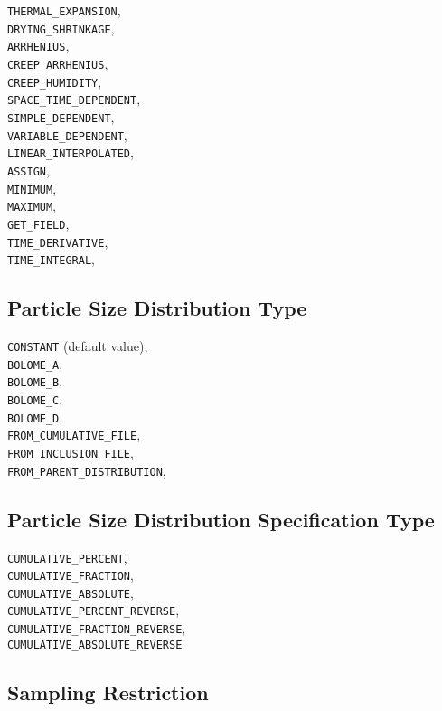 \documentclass[10pt]{article}
\begin{document}
\verb+THERMAL_EXPANSION+,\\
\verb+DRYING_SHRINKAGE+,\\
\verb+ARRHENIUS+,\\
\verb+CREEP_ARRHENIUS+,\\
\verb+CREEP_HUMIDITY+,\\
\verb+SPACE_TIME_DEPENDENT+,\\
\verb+SIMPLE_DEPENDENT+,\\
\verb+VARIABLE_DEPENDENT+,\\
\verb+LINEAR_INTERPOLATED+,\\
\verb+ASSIGN+,\\
\verb+MINIMUM+,\\
\verb+MAXIMUM+,\\
\verb+GET_FIELD+,\\
\verb+TIME_DERIVATIVE+,\\
\verb+TIME_INTEGRAL+,\\

\subsection{Particle Size Distribution Type}

\verb+CONSTANT+ (default value),\\
\verb+BOLOME_A+,\\
\verb+BOLOME_B+,\\
\verb+BOLOME_C+,\\
\verb+BOLOME_D+,\\
\verb+FROM_CUMULATIVE_FILE+,\\
\verb+FROM_INCLUSION_FILE+,\\
\verb+FROM_PARENT_DISTRIBUTION+,\\

\subsection{Particle Size Distribution Specification Type}
	\verb+CUMULATIVE_PERCENT+,\\
	\verb+CUMULATIVE_FRACTION+,\\
	\verb+CUMULATIVE_ABSOLUTE+,\\
	\verb+CUMULATIVE_PERCENT_REVERSE+,\\
	\verb+CUMULATIVE_FRACTION_REVERSE+,\\
	\verb+CUMULATIVE_ABSOLUTE_REVERSE+


\subsection{Sampling Restriction}
\end{document}
